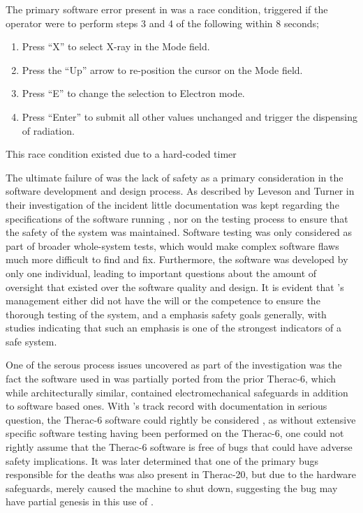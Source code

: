 \documentclass{cshonours}
\begin{document}
The primary software error present in \ther was a race condition, triggered if the operator were to perform steps 3 and 4 of the following within 8 seconds;
\begin{enumerate}
 \item Press ``X'' to select X-ray in the Mode field.
 \item Press the ``Up'' arrow to re-position the cursor on the Mode field.
 \item Press ``E'' to change the selection to Electron mode.
 \item Press ``Enter'' to submit all other values unchanged and trigger the dispensing of radiation.
\end{enumerate}
This race condition existed due to a hard-coded timer 

The ultimate failure of \ther was the lack of safety as a primary consideration in the software development and design process. As described by Leveson and Turner in their investigation of the incident \cite{leveson1993investigation} little documentation was kept regarding the specifications of the software running \ther, nor on the testing process to ensure that the safety of the system was maintained. Software testing was only considered as part of broader whole-system tests, which would make complex software flaws much more difficult to find and fix. Furthermore, the software was developed by only one individual, leading to important questions about the amount of oversight that existed over the software quality and design. It is evident that \aecl's management either did not have the will or the competence to ensure the thorough testing of the \ther system, and a emphasis safety goals generally, with studies indicating that such an emphasis is one of the strongest indicators of a safe system. \cite[p.~415]{saferworld}

One of the serous process issues uncovered as part of the \ther investigation was the fact the software used in \ther was partially ported from the prior Therac-6, which while architecturally similar, contained electromechanical safeguards in addition to software based ones. With \aecl's track record with documentation in serious question, the Therac-6 software could rightly be considered \soup, as without extensive specific software testing having been performed on the Therac-6, one could not rightly assume that the Therac-6 software is free of bugs that could have adverse safety implications. It was later determined that one of the primary bugs responsible for the \ther deaths was also present in Therac-20, but due to the hardware safeguards, merely caused the machine to shut down, suggesting the bug may have partial genesis in this use of \soup.
\end{document}
